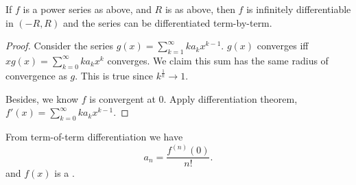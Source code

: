 \begin{theorem}
	If $f$ is a power series as above, and $R$ is as above, then $f$ is infinitely differentiable in $(-R, R)$ and the series can be differentiated term-by-term.
\end{theorem}
\begin{proof}
	Consider the series
	$g(x) = \sum_{k=1}^{\infty} k a_k x^{k-1}$. $g(x)$ converges iff $x g(x) = \sum_{k=0}^{\infty} k a_k x^k $ converges. We claim this sum has the same radius of convergence as $g$. This is true since $k^{\frac{1}{k}}\to  1$. 

	Besides, we know $f$ is convergent at $0$. Apply differentiation theorem,
	$f'(x) = \sum_{k=0}^{\infty} k a_k x^{k-1}$.
\end{proof}
\begin{remark}
	From term-of-term differentiation we have
	\[
		a_n = \frac{f^{(n)}(0)}{n!}
	.\] 
	and $f(x)$ is a .
\end{remark}




